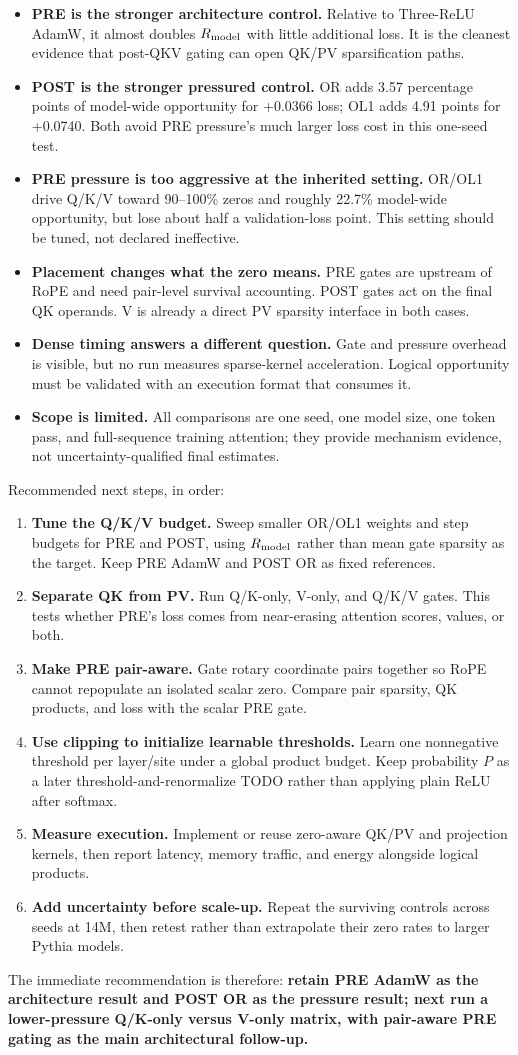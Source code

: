 \documentclass[10pt]{article}
\newcommand{\pct}{\%}
\begin{document}
\begin{itemize}
\item \textbf{PRE is the stronger architecture control.} Relative to Three-ReLU AdamW, it almost doubles $R_{\rm model}$ with little additional loss. It is the cleanest evidence that post-QKV gating can open QK/PV sparsification paths.
\item \textbf{POST is the stronger pressured control.} OR adds 3.57 percentage points of model-wide opportunity for +0.0366 loss; OL1 adds 4.91 points for +0.0740. Both avoid PRE pressure's much larger loss cost in this one-seed test.
\item \textbf{PRE pressure is too aggressive at the inherited setting.} OR/OL1 drive Q/K/V toward 90--100\pct{} zeros and roughly 22.7\pct{} model-wide opportunity, but lose about half a validation-loss point. This setting should be tuned, not declared ineffective.
\item \textbf{Placement changes what the zero means.} PRE gates are upstream of RoPE and need pair-level survival accounting. POST gates act on the final QK operands. V is already a direct PV sparsity interface in both cases.
\item \textbf{Dense timing answers a different question.} Gate and pressure overhead is visible, but no run measures sparse-kernel acceleration. Logical opportunity must be validated with an execution format that consumes it.
\item \textbf{Scope is limited.} All comparisons are one seed, one model size, one token pass, and full-sequence training attention; they provide mechanism evidence, not uncertainty-qualified final estimates.
\end{itemize}

Recommended next steps, in order:
\begin{enumerate}
\item \textbf{Tune the Q/K/V budget.} Sweep smaller OR/OL1 weights and step budgets for PRE and POST, using $R_{\rm model}$ rather than mean gate sparsity as the target. Keep PRE AdamW and POST OR as fixed references.
\item \textbf{Separate QK from PV.} Run Q/K-only, V-only, and Q/K/V gates. This tests whether PRE's loss comes from near-erasing attention scores, values, or both.
\item \textbf{Make PRE pair-aware.} Gate rotary coordinate pairs together so RoPE cannot repopulate an isolated scalar zero. Compare pair sparsity, QK products, and loss with the scalar PRE gate.
\item \textbf{Use clipping to initialize learnable thresholds.} Learn one nonnegative threshold per layer/site under a global product budget. Keep probability $P$ as a later threshold-and-renormalize TODO rather than applying plain ReLU after softmax.
\item \textbf{Measure execution.} Implement or reuse zero-aware QK/PV and projection kernels, then report latency, memory traffic, and energy alongside logical products.
\item \textbf{Add uncertainty before scale-up.} Repeat the surviving controls across seeds at 14M, then retest rather than extrapolate their zero rates to larger Pythia models.
\end{enumerate}

The immediate recommendation is therefore: \textbf{retain PRE AdamW as the architecture result and POST OR as the pressure result; next run a lower-pressure Q/K-only versus V-only matrix, with pair-aware PRE gating as the main architectural follow-up.}
\end{document}
